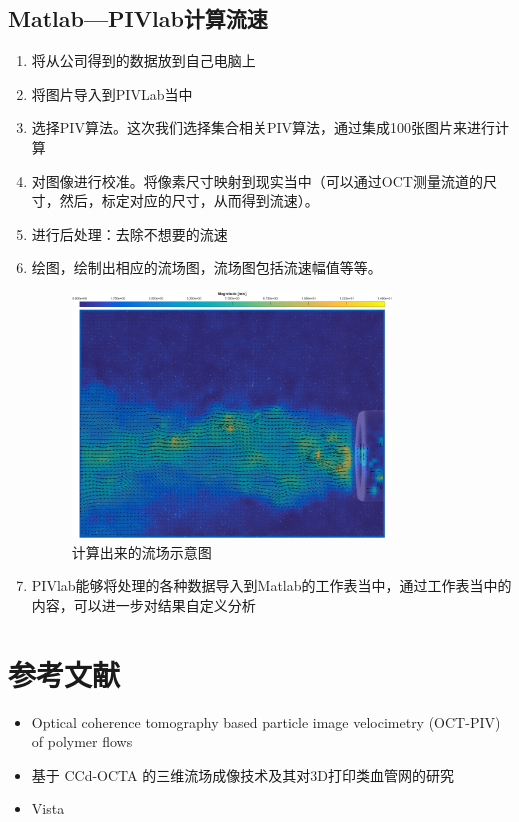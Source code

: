 \documentclass[12pt]{article}
\begin{document}
\subsection{Matlab—PIVlab计算流速}
\begin{enumerate}
    \item 将从公司得到的数据放到自己电脑上
    \item 将图片导入到PIVLab当中
    \item 选择PIV算法。这次我们选择集合相关PIV算法，通过集成100张图片来进行计算
    \item 对图像进行校准。将像素尺寸映射到现实当中（可以通过OCT测量流道的尺寸，然后，标定对应的尺寸，从而得到流速）。
    \item 进行后处理：去除不想要的流速
    \item 绘图，绘制出相应的流场图，流场图包括流速幅值等等。
    
    \begin{figure}[H]
        \centering
        \includegraphics[width=0.8\textwidth]{Images/经过Matlab处理后的图片.png}
        \caption{计算出来的流场示意图}
    \end{figure}
    
    \item PIVlab能够将处理的各种数据导入到Matlab的工作表当中，通过工作表当中的内容，可以进一步对结果自定义分析
\end{enumerate}

\section{参考文献}
\begin{itemize}
    \item Optical coherence tomography based particle image velocimetry (OCT-PIV) of polymer flows
    \item 基于 CCd-OCTA 的三维流场成像技术及其对3D打印类血管网的研究 
    \item Vista
    \end{itemize}
\end{document}
